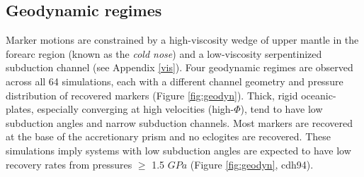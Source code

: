 \hypertarget{geodynamics}{%
\subsection{Geodynamic regimes}\label{geodynamics}}

Marker motions are constrained by a high-viscosity wedge of upper mantle in the forearc region (known as the \emph{cold nose}) and a low-viscosity serpentinized subduction channel (see Appendix \ref{vis}). Four geodynamic regimes are observed across all 64 simulations, each with a different channel geometry and pressure distribution of recovered markers (Figure \ref{fig:geodyn}). Thick, rigid oceanic-plates, especially converging at high velocities (high-\(\Phi\)), tend to have low subduction angles and narrow subduction channels. Most markers are recovered at the base of the accretionary prism and no eclogites are recovered. These simulations imply systems with low subduction angles are expected to have low recovery rates from pressures \(\geq\) 1.5 \(GPa\) (Figure \ref{fig:geodyn}, cdh94).



